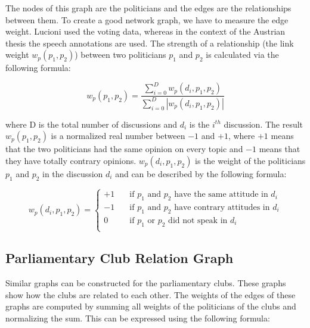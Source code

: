 The nodes of this graph are the politicians and the edges are the relationships between them. To create a good network graph, we have to measure the edge weight. Lucioni \cite{Lucioni_2015} used the voting data, whereas in the context of the Austrian thesis the speech annotations are used. The strength of a relationship (the link weight $w_p(p_1,p_2)$) between two politicians $p_1$ and $p_2$ is calculated via the following formula:

$$w_p(p_1,p_2) = \frac{\displaystyle\sum_{i=0}^{D} w_p(d_i,p_1,p_2)}{\displaystyle\sum_{i=0}^{D} |w_p(d_i,p_1,p_2)|}$$

where D is the total number of discussions and $d_i$ is the $i^{th}$ discussion. The result $w_p(p_1,p_2)$ is a normalized real number between $-1$ and $+1$, where $+1$ means that the two politicians had the same opinion on every topic and $-1$ means that they have totally contrary opinions. $w_p(d_i,p_1,p_2)$ is the weight of the politicians $p_1$ and $p_2$ in the discussion $d_i$ and can be described by the following formula:

$$w_p(d_i,p_1,p_2) = 
\begin{cases}
    +1       & \quad \text{if } p_1 \text{ and } p_2 \text{ have the same attitude in } d_i\\
    -1  & \quad \text{if } p_1 \text{ and } p_2 \text{ have contrary attitudes in } d_i\\
        0       & \quad \text{if } p_1 \text{ or } p_2 \text{ did not speak in } d_i\\
\end{cases}
$$



\subsection{Parliamentary Club Relation Graph}
\label{sec:club_relation_graph}
Similar graphs can be constructed for the parliamentary clubs. These graphs show how the clubs are related to each other. The weights of the edges of these graphs are computed by summing all weights of the politicians of the clubs and normalizing the sum. This can be expressed using the following formula:


